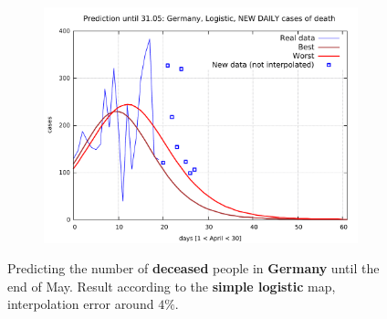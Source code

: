 \documentclass[8pt]{article}
\begin{document}
\begin{figure}[h!]
\begin{subfigure}[b]{0.48\linewidth}
  \includegraphics[width=\linewidth]{../de_l_d/peak/peak_prediction.pdf}
  \end{subfigure}
	\caption{Predicting the number of \textbf{deceased}
	people in \textbf{Germany} until the
	end of May. Result according to the \textbf{simple logistic} map, 
	interpolation error around $4\%$.}
\end{figure}
\end{document}

